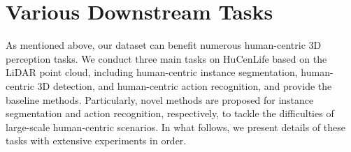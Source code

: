 




\section{Various Downstream Tasks}

As mentioned above, our dataset can benefit numerous human-centric 3D perception tasks. We conduct three main tasks on HuCenLife based on the LiDAR point cloud, including human-centric instance segmentation, human-centric 3D detection, and human-centric action recognition, and provide the baseline methods. Particularly, novel methods are proposed for instance segmentation and action recognition, respectively, to tackle the difficulties of large-scale human-centric scenarios. In what follows, we present details of these tasks with extensive experiments in order.